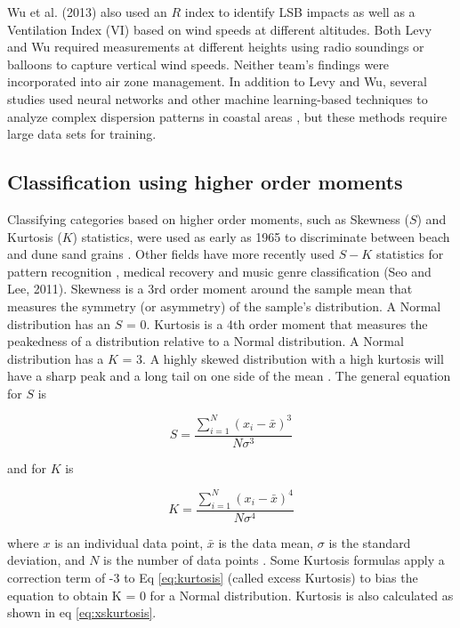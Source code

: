 Wu et al. (2013) also used an $R$ index to identify LSB impacts as well as a Ventilation Index (VI) based on wind speeds at different altitudes.  Both Levy and Wu required measurements at different heights using radio soundings or balloons to capture vertical wind speeds.  Neither team’s findings were incorporated into air zone management.  In addition to Levy and Wu, several studies used neural networks and other machine learning-based techniques to analyze complex dispersion patterns in coastal areas \citep{Elangasinghe2014, Feng2015}, but these methods require large data sets for training. 

\subsection{Classification using higher order moments}
Classifying categories based on higher order moments, such as Skewness ($S$) and Kurtosis ($K$) statistics, were used as early as 1965 to discriminate between beach and dune sand grains \citep{Martins1965}.  Other fields have more recently used $S-K$ statistics for pattern recognition \citep{Crosilla2013}, medical recovery \citep{Chi2008} and music genre classification (Seo and Lee, 2011).  Skewness is a 3rd order moment around the sample mean that measures the symmetry (or asymmetry) of the sample’s distribution. A Normal distribution has an $S$ = 0. Kurtosis is a 4th order moment that measures the peakedness of a distribution relative to a Normal distribution. A Normal distribution has a $K$ = 3. A highly skewed distribution with a high kurtosis will have a sharp peak and a long tail on one side of the mean \citep{NIST2013}.  The general equation for $S$ is

\begin{equation}
\label{eq:skewness}
S = \frac{\sum_{i=1}^{N}\left (x_{i}-\bar{x} \right )^{3}}{N\sigma^{3}}
\end{equation}

\noindent
and for $K$ is 

\begin{equation}
\label{eq:kurtosis}
K = \frac{\sum_{i=1}^{N}\left (x_{i}-\bar{x} \right )^{4}}{N\sigma^{4}}
\end{equation}

\noindent
where $x$ is an individual data point, $\bar{x}$ is the data mean, $\sigma$ is the standard deviation, and $N$ is the number of data points \citep{Cristelli2012}.    Some Kurtosis formulas apply a correction term of -3 to Eq \ref{eq:kurtosis} (called excess Kurtosis) to bias the equation to obtain K = 0 for a Normal distribution.  Kurtosis is also calculated as shown in eq \ref{eq:xskurtosis}.

